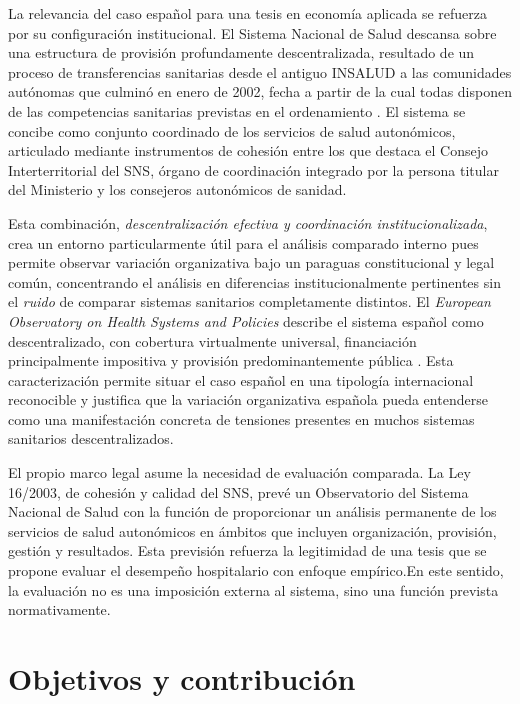 La relevancia del caso español para una tesis en economía aplicada se refuerza por su configuración institucional. El Sistema Nacional de Salud descansa sobre una estructura de 
provisión profundamente descentralizada, resultado de un proceso de transferencias sanitarias desde el antiguo INSALUD a las comunidades autónomas que culminó en enero de 2002, fecha a partir de la cual todas  disponen de las competencias sanitarias previstas en el ordenamiento \citep{observatorioHIT2024}. El sistema se concibe como conjunto coordinado de los servicios de salud autonómicos, articulado mediante instrumentos de cohesión entre los que destaca el Consejo Interterritorial del SNS, órgano de coordinación integrado por la persona titular del Ministerio y los consejeros autonómicos de sanidad.

Esta combinación, \emph{descentralización efectiva y coordinación institucionalizada}, crea un entorno particularmente útil para el análisis comparado interno pues permite observar variación organizativa bajo un paraguas constitucional y legal común, concentrando el análisis en diferencias institucionalmente pertinentes sin el \textit{ruido} de comparar sistemas sanitarios completamente distintos. El \textit{European Observatory on Health Systems and Policies} describe el sistema español como descentralizado, con cobertura virtualmente universal, financiación principalmente impositiva y provisión predominantemente pública \citep{observatorioHIT2024}. Esta caracterización  permite situar el caso español en una tipología internacional reconocible y justifica que la variación organizativa española pueda entenderse como una manifestación concreta de tensiones presentes en muchos sistemas sanitarios descentralizados.

El propio marco legal asume la necesidad de evaluación comparada. La Ley 16/2003, de cohesión y calidad del SNS, prevé un Observatorio del Sistema Nacional de Salud con la función de proporcionar un análisis permanente de los servicios de salud autonómicos en ámbitos que incluyen organización, provisión, gestión y resultados. Esta previsión refuerza la legitimidad de una tesis que se propone evaluar el desempeño hospitalario con enfoque empírico.En este sentido, la evaluación no es una imposición externa al sistema, sino una función prevista normativamente.

\section{Objetivos y contribución}


